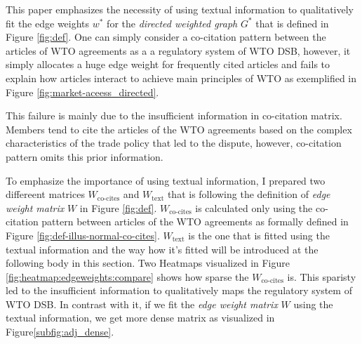 This paper emphasizes the necessity of using textual information 
to qualitatively fit the edge weights $w^*$ for the \textit{directed weighted graph} $G^*$ that is defined in Figure \ref{fig:def}. 
One can simply consider a co-citation pattern between the articles of WTO agreements as a a regulatory system of WTO DSB, however,
it simply allocates a huge edge weight for frequently cited articles and fails to explain how articles interact to achieve main principles of WTO as exemplified in Figure \ref{fig:market-aceess_directed}.

This failure is mainly due to the insufficient information in co-citation matrix. Members tend to cite the articles of 
the WTO agreements based on the complex characteristics of 
the trade policy that led to the dispute, however, co-citation pattern omits this prior information.

To emphasize the importance of using textual information, I prepared two differeent matrices $W_{\text{co-cites}}$ and $W_{\text{text}}$ that is following the definition of \textit{edge weight matrix} $W$ in Figure \ref{fig:def}.
$W_{\text{co-cites}}$ is calculated only using the co-citation pattern between articles of the WTO agreements as formally defined in Figure \ref{fig:def-illus-normal-co-cites}. 
$W_{\text{text}}$ is the one that is fitted using the textual information and the way how it's fitted will be introduced at the following body in this section.
Two Heatmaps visualized in Figure \ref{fig:heatmap:edgeweights:compare} shows how sparse the $W_{\text{co-cites}}$ is. This sparisty led to the insufficient information
to qualitatively maps the regulatory system of WTO DSB. In contrast with it, if we fit the \textit{edge weight matrix} $W$ using the textual information, we get more dense matrix as visualized in Figure\ref{subfig:adj_dense}.










